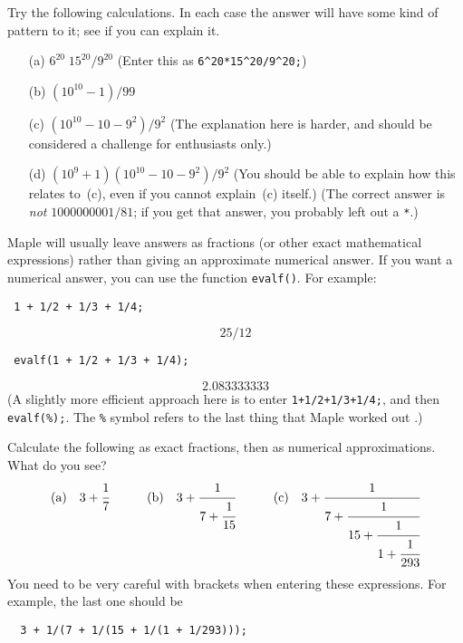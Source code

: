 \documentclass[a4paper,10pt]{amsbook}
\numberwithin{example}{chapter}
\begin{document}
\begin{exercise}\label{ex-numeric-misc}
 Try the following calculations.  In each case the answer will have
 some kind of pattern to it; see if you can explain it. 
 \begin{itemize}
  \item[(a)] $6^{20}\;15^{20}/9^{20}$ (Enter this as
   \verb~6^20*15^20/9^20;~) 
  \item[(b)] $(10^{10}-1)/99$
  \item[(c)] $(10^{10}-10-9^2)/9^2$ (The explanation here is
   harder, and should be considered a challenge for enthusiasts only.)  
  \item[(d)] $(10^9+1)(10^{10}-10-9^2)/9^2$ (You should be able to
   explain how this relates to~(c), even if you cannot explain~(c)
   itself.)  (The correct answer is \emph{not}
   $1000000001/81$; if you get that answer, you probably
   left out a \verb~*~.) 
 \end{itemize}
\end{exercise}

Maple will usually leave answers as fractions (or other exact
mathematical expressions) rather than giving an approximate numerical
answer.  If you want a numerical answer, you can use the function
\verb~evalf()~.  For example:
\begin{verbatim}
 1 + 1/2 + 1/3 + 1/4;
\end{verbatim}
\[ 25/12 \]
\begin{verbatim}
 evalf(1 + 1/2 + 1/3 + 1/4);
\end{verbatim}
\[ 2.083333333 \]
(A slightly more efficient approach here is to enter
\verb~1+1/2+1/3+1/4;~, and then \verb~evalf(%);~.  The
\verb~%~ symbol refers to the last thing that Maple worked
out \note{\NOTEpercent}.) 

\begin{exercise}\label{ex-cfrac-pi}
 Calculate the following as exact fractions, then as numerical
 approximations.  What do you see? 
 \[ \text{(a)}\hspace{1em}
     3+\cfrac{1}{7}
    \hspace{3em}
    \text{(b)}\hspace{1em}
     3+\cfrac{1}{7 + \cfrac{1}{15}}
    \hspace{3em}
    \text{(c)}\hspace{1em}
     3+\cfrac{1}{7 + \cfrac{1}{15 + \cfrac{1}{1 + \cfrac{1}{293}}}}  
  \]
  You need to be very careful with brackets when entering these
  expressions.  For example, the last one should be
\begin{verbatim}
  3 + 1/(7 + 1/(15 + 1/(1 + 1/293)));
\end{verbatim}
\end{exercise}
\end{document}
